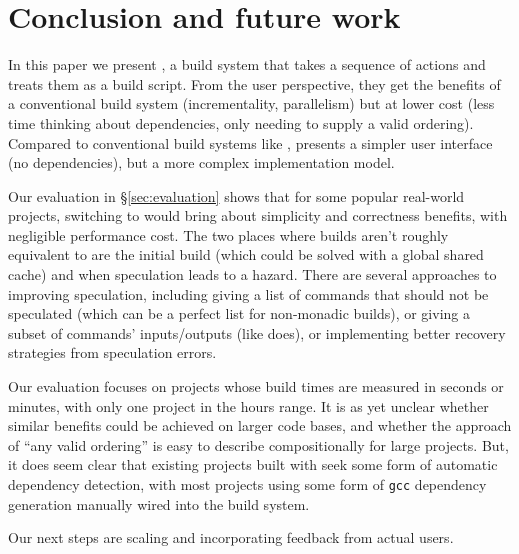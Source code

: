 \section{Conclusion and future work}
\label{sec:conclusion}

In this paper we present \Rattle, a build system that  takes a sequence of actions and treats them as a build script. From the user perspective, they get the benefits of a conventional build system (incrementality, parallelism) but at lower cost (less time thinking about dependencies, only needing to supply a valid ordering). Compared to conventional build systems like \Make,  \Rattle presents a simpler user interface (no dependencies), but a more complex implementation model.

Our evaluation in \S\ref{sec:evaluation} shows that for some popular real-world projects, switching to \Rattle would bring about simplicity and correctness benefits, with negligible performance cost. The two places where builds aren't roughly equivalent to \Make are the initial build (which could be solved with a global shared cache) and when speculation leads to a hazard. There are several approaches to improving speculation, including giving \Rattle a list of commands that should not be speculated (which can be a perfect list for non-monadic builds), or giving \Rattle a subset of commands' inputs/outputs (like \Fac does), or implementing better recovery strategies from speculation errors.

Our evaluation focuses on projects whose build times are measured in seconds or minutes, with only one project in the hours range. It is as yet unclear whether similar benefits could be achieved on larger code bases, and whether the \Rattle approach of ``any valid ordering'' is easy to describe compositionally for large projects.  But, it does seem clear that existing projects built with \Make seek some form of automatic dependency detection, with most projects using some form of \texttt{gcc} dependency generation manually wired into the build system.

Our next steps are scaling \Rattle and incorporating feedback from actual users.


